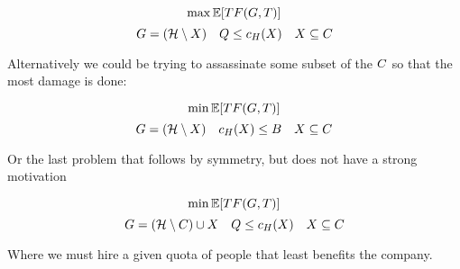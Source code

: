 $$ \max \mathbb{E}[TF(G,T)] $$
$$ G = (\mathcal{H} \setminus X) \quad Q \le c_H(X) \quad  X \subseteq C $$

Alternatively we could be trying to assassinate some subset of the ${C}$ so that the most damage is done:

$$ \min \mathbb{E}[TF(G,T)] $$
$$ G = (\mathcal{H} \setminus X) \quad c_H(X) \le B \quad  X \subseteq C $$

Or the last problem that follows by symmetry, but does not have a strong motivation

$$ \min \mathbb{E}[TF(G,T)] $$
$$ G = (\mathcal{H} \setminus {C}) \cup X \quad Q \le c_H(X) \quad  X \subseteq C $$

Where we must hire a given quota of people that least benefits the company. 

